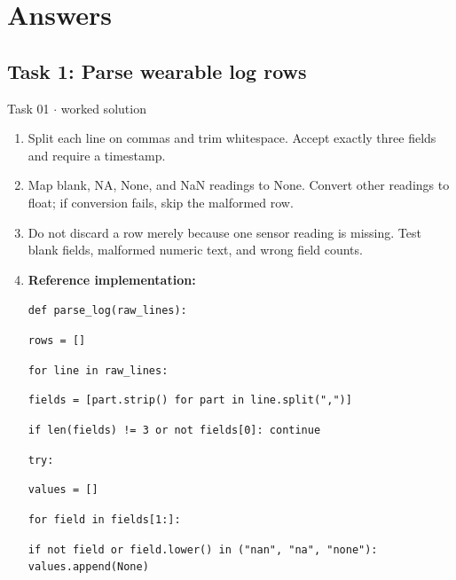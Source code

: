 \documentclass[11pt]{article}
\begin{document}
\section{Answers}
\begin{keepsection}\subsection{Task 1: Parse wearable log rows}

\begin{workedbox}{Task 01 \ensuremath{\cdot} worked solution}
\begin{enumerate}
\item Split each line on commas and trim whitespace. Accept exactly three fields and require a timestamp.
\item Map blank, NA, None, and NaN readings to None. Convert other readings to float; if conversion fails, skip the malformed row.
\item Do not discard a row merely because one sensor reading is missing. Test blank fields, malformed numeric text, and wrong field counts.
\item {}
\textbf{Reference implementation:}
\begin{tcolorbox}[colback=Paperblue,colframe=Paperblue,boxrule=0pt,arc=0pt,left=7pt,right=7pt,top=5pt,bottom=5pt]\small\sloppy
\noindent\hspace*{0em}\texttt{def parse\_log(raw\_lines):}\par
\noindent\hspace*{1em}\texttt{rows = []}\par
\noindent\hspace*{1em}\texttt{for line in raw\_lines:}\par
\noindent\hspace*{3em}\texttt{fields = [part.strip() for part in line.split(",")]}\par
\noindent\hspace*{3em}\texttt{if len(fields) != 3 or not fields[0]: continue}\par
\noindent\hspace*{3em}\texttt{try:}\par
\noindent\hspace*{5em}\texttt{values = []}\par
\noindent\hspace*{5em}\texttt{for field in fields[1:]:}\par
\noindent\hspace*{7em}\texttt{if not field or field.lower() in ("nan", "na", "none"): values.append(None)}\par

\end{tcolorbox}
\end{enumerate}
\end{workedbox}
\end{keepsection}
\end{document}
